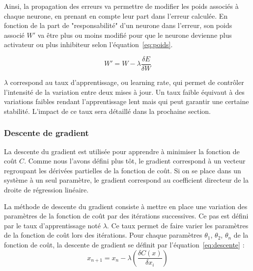 Ainsi, la propagation des erreurs va permettre de modifier les poids associés à chaque neurone, en prenant en compte leur part dans l'erreur calculée. En fonction de la part de "responsabilité" d'un neurone dans l'erreur, son poids associé $W'$ va être plus ou moins modifié pour que le neurone devienne plus activateur ou plus inhibiteur selon l'équation~\ref{eq:poids}.

\begin{equation}
  W' = W - \lambda \frac{\delta E}{\delta W}
  \label{eq:poids}
\end{equation}

$\lambda$ correspond au taux d'apprentissage, ou learning rate, qui permet de contrôler l'intensité de la variation entre deux mises à jour. Un taux faible équivaut à des variations faibles rendant l’apprentissage lent mais qui peut garantir une certaine stabilité. L'impact de ce taux sera détaillé dans la prochaine section.

\subsubsection{Descente de gradient}
La descente du gradient est utilisée pour apprendre à minimiser la fonction de coût $C$. Comme nous l'avons défini plus tôt, le gradient correspond à un vecteur regroupant les dérivées partielles de la fonction de coût. Si on se place dans un système à un seul paramètre, le gradient correspond au coefficient directeur de la droite de régression linéaire. %

La méthode de descente du gradient consiste à mettre en place une variation des paramètres de la fonction de coût par des itérations successives. Ce pas est défini par le taux d'apprentissage noté $\lambda$. Ce taux permet de faire varier les paramètres de la fonction de coût lors des itérations. Pour chaque paramètres $\theta_1$, $\theta_2$, $\theta_n$ de la fonction de coût, la descente de gradient se définit par l'équation~\ref{eq:descente} :
\begin{equation}
  x_{n+1} = x_n - \lambda (\dfrac{\delta C(x)}{\delta x_i})
  \label{eq:descente}
\end{equation}



